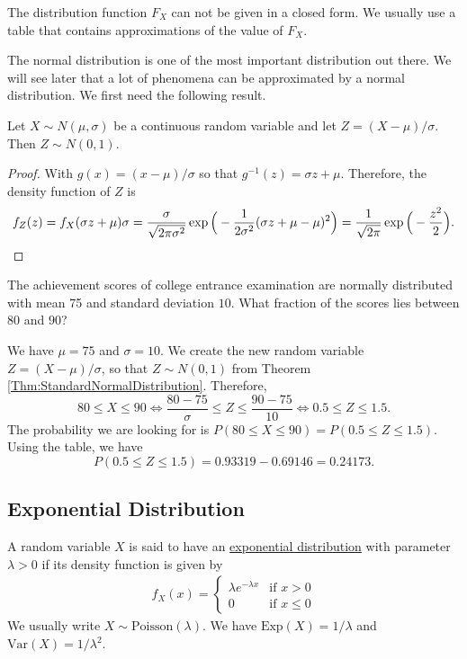 The distribution function $F_X$ can not be given in a closed form. We usually use a table that contains approximations of the value of $F_X$. 

The normal distribution is one of the most important distribution out there. We will see later that a lot of phenomena can be approximated by a normal distribution. We first need the following result.

\begin{theorem}\label{Thm:StandardNormalDistribution}
Let $X \sim N (\mu , \sigma )$ be a continuous random variable and let $Z = (X - \mu )/ \sigma$. Then $Z \sim N (0, 1)$.
\end{theorem}
\begin{proof}
With $g(x) = (x - \mu ) / \sigma$ so that $g^{-1} (z) = \sigma z + \mu$. Therefore, the density function of $Z$ is
    \[
        f_Z (z) = f_X (\sigma z + \mu ) \sigma = \frac{\sigma}{\sqrt{2\pi\sigma^2}} \exp \Big(-\frac{1}{2\sigma^2} (\sigma z + \mu - \mu )^2 \Big) = \frac{1}{\sqrt{2\pi}} \exp \Big( -\frac{z^2}{2} \Big) . \qedhere
    \]
\end{proof}

\begin{example}
The achievement scores of college entrance examination are normally distributed with mean 75 and standard deviation $10$. What fraction of the scores lies between $80$ and $90$?
\end{example}

\begin{sol*}
We have $\mu = 75$ and $\sigma = 10$. We create the new random variable $Z = (X - \mu)/ \sigma$, so that $Z \sim N (0, 1)$ from Theorem \ref{Thm:StandardNormalDistribution}. Therefore,
    \[
        80 \leq X \leq 90 \iff \frac{80-75}{\sigma} \leq Z \leq \frac{90 - 75}{10} \iff 0.5 \leq Z \leq 1.5 .
    \]
The probability we are looking for is $P (80 \leq X \leq 90 ) = P (0.5 \leq Z \leq 1.5 )$. Using the table, we have
    \[
        P (0.5 \leq Z \leq 1.5) = 0.93319 - 0.69146 = 0.24173 . \tag*{$\triangle$}
    \]
\end{sol*}

\subsection*{Exponential Distribution}

A random variable $X$ is said to have an \underline{exponential distribution} with parameter $\lambda > 0$ if its density function is given by
    \begin{align*}
    f_X (x) = \left\{ \begin{matrix} \lambda e^{-\lambda x} & \text{if } x > 0 \\ 0 & \text{if } x \leq 0 \end{matrix} \right. 
    \end{align*}
We usually write $X \sim \mathrm{Poisson} (\lambda )$. We have $\mathrm{Exp} (X) = 1/\lambda$ and $\mathrm{Var} (X) = 1/\lambda^2$.

